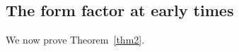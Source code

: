 \documentclass[12pt]{amsart}
\begin{document}

 


 
\subsection{The form factor at early times}
We now prove Theorem~\ref{thm2}.


%
  
\end{document}
